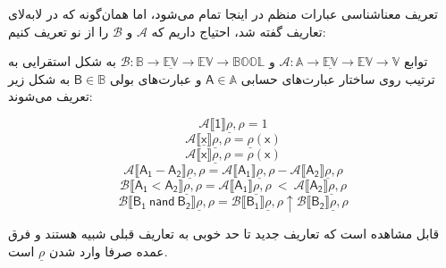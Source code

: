 تعریف معناشناسی عبارات منظم در اینجا تمام می‌شود، اما همان‌گونه که در لا‌به‌لای تعاریف گفته ‌شد، احتیاج داریم که $\mathcal{A}$ و $\mathcal{B}$ را از نو تعریف کنیم:
\begin{defn}
	توابع 
	$\mathcal{A}:\mathbb{A}\rightarrow \mathbb{\underline{EV}} \rightarrow
	\mathbb{EV} \rightarrow \mathbb{V}$
	و 
	$\mathcal{B}:\mathbb{B}\rightarrow \mathbb{\underline{EV}} \rightarrow
	\mathbb{EV} \rightarrow \mathbb{BOOL}$
	به شکل استقرایی به ترتیب روی ساختار عبارت‌های حسابی 
	$\mathsf{A}\in\mathbb{A}$
	و عبارت‌های بولی
	$\mathsf{B} \in \mathbb{B}$
	به شکل زیر تعریف می‌شوند:
	
	
$$\mathcal{A}\llbracket\mathsf{1}\rrbracket\underline{\rho},\rho=1$$
$$\mathcal{A}\llbracket\mathsf{\underline{\mathsf{x}}}\rrbracket\underline{\rho},\rho= \underline{\rho}(\mathsf{x})$$
$$\mathcal{A}\llbracket\mathsf{\mathsf{x}}\rrbracket\underline{\rho},\rho= \rho(\mathsf{x})$$
$$\mathcal{A}\llbracket\mathsf{A_1 - A_2}\rrbracket\underline{\rho},\rho= 
\mathcal{A}\llbracket\mathsf{A_1}\rrbracket\underline{\rho},\rho - \mathcal{A}\llbracket\mathsf{A_2}\rrbracket\underline{\rho},\rho$$
$$\mathcal{B}\llbracket\mathsf{A_1 < A_2}\rrbracket\underline{\rho},\rho=
	\mathcal{A}\llbracket\mathsf{A_1}\rrbracket\underline{\rho},\rho\: <\: \mathcal{A}\llbracket\mathsf{A_2}\rrbracket\underline{\rho},\rho$$
$$\mathcal{B}\llbracket\mathsf{B_1\:nand\:B_2}\rrbracket\underline{\rho},\rho=
\mathcal{B}\llbracket\mathsf{B_1}\rrbracket\underline{\rho},\rho \uparrow 
\mathcal{B}\llbracket\mathsf{B_2}\rrbracket\underline{\rho},\rho $$
\end{defn}
قابل مشاهده است که تعاریف جدید تا حد خوبی به تعاریف قبلی شبیه هستند و فرق عمده صرفا وارد شدن $\underline{\rho}$ است.\\

